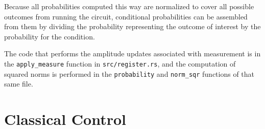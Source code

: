 \documentclass[%
 reprint,
 amsmath,amssymb,
 aps,
]{revtex4-2}
\begin{document}
Because all probabilities computed this way are normalized to cover all possible outcomes from running the circuit, conditional probabilities can be assembled from them by dividing the probability representing the outcome of interest by the probability for the condition. 

The code that performs the amplitude updates associated with measurement is in the \texttt{apply\_measure} function in \texttt{src/register.rs}, and the computation of squared norms is performed in the \texttt{probability} and \texttt{norm\_sqr}  functions of that same file.

\section{\label{sec:level1} Classical Control}


\nocite{*}

\end{document}
